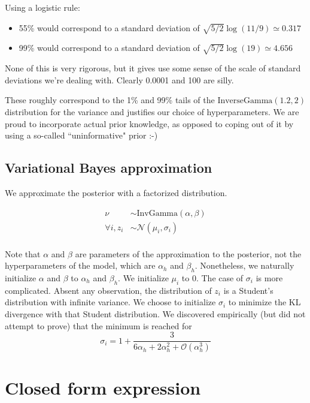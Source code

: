\documentclass[12pt]{article}
\begin{document}
    Using a logistic rule:
    \begin{itemize}
    \item 55\% would correspond to a standard deviation of $\sqrt{5/2} \log(11/9) \simeq 0.317$
    \item 99\% would correspond to a standard deviation of $\sqrt{5/2} \log(19) \simeq 4.656$
    \end{itemize}

    None of this is very rigorous, but it gives use some sense of the scale
    of standard deviations we're dealing with. Clearly 0.0001 and 100 are silly.

    These roughly correspond to the 1\% and 99\% tails of the
    $\text{InverseGamma}(1.2, 2)$ distribution for the variance and justifies our choice of hyperparameters.
    We are proud to incorporate actual prior knowledge, as opposed
    to coping out of it by using a so-called ``uninformative" prior :-)

\subsection{Variational Bayes approximation}

We approximate the posterior with a factorized distribution.

\begin{equation}
    \begin{aligned}
        \nu &\sim \text{InvGamma}(\alpha, \beta) \\
        \forall i, z_i &\sim \mathcal{N}(\mu_i, \sigma_i) \\
    \end{aligned}
\end{equation}

Note that $\alpha$ and $\beta$ are parameters of the approximation to the posterior, not the hyperparameters of the model, which are
$\alpha_h$ and $\beta_h$. Nonetheless, we naturally initialize $\alpha$ and $\beta$ to $\alpha_h$ and $\beta_h$. We initialize $\mu_i$ to $0$.
The case of $\sigma_i$ is more complicated. Absent any observation, the distribution of $z_i$ is a Student's distribution with
infinite variance. We choose to initialize $\sigma_i$ to minimize the KL divergence with that Student distribution. We discovered
empirically (but did not attempt to prove) that the minimum is reached for
$$\sigma_i = 1 + \frac{3}{6 \alpha_h + 2 \alpha_h^2 + \mathcal{O}(\alpha_h^3)}$$


\section{Closed form expression }
\end{document}
